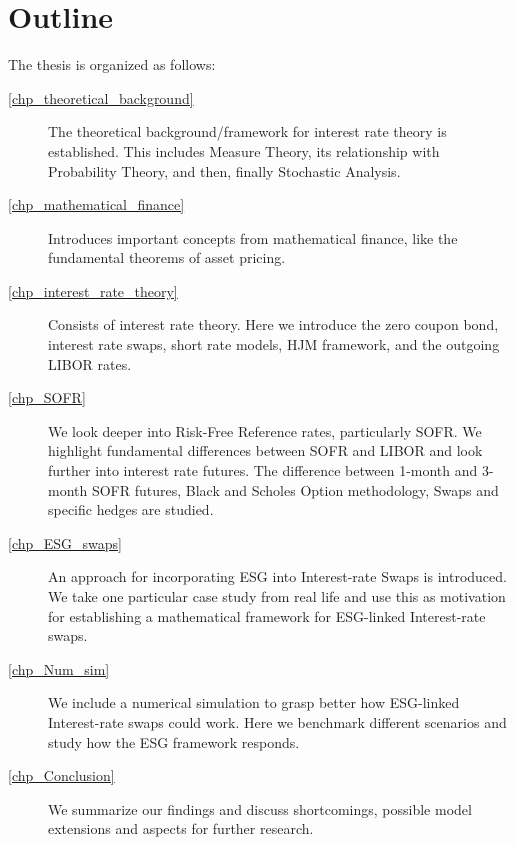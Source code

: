 \begin{comment}
 This thesis studies Risk-free reference rates (SOFR), the new key RFR in US dollars and ESG-linked interest rate swaps.   
\end{comment}

\newpage 

\section{Outline}

The thesis is organized as follows: 
\begin{description}
    \item[\cref{chp_theoretical_background}]
    The theoretical background/framework for interest rate theory is established. This includes Measure Theory, its relationship with Probability Theory, and then, finally Stochastic Analysis.  

    \item[\cref{chp_mathematical_finance}] Introduces important concepts from mathematical finance, like the fundamental theorems of asset pricing. 

    \item[\cref{chp_interest_rate_theory}] Consists of interest rate theory. Here we introduce the zero coupon bond, interest rate swaps, short rate models, HJM framework, and the outgoing LIBOR rates.

    \item[\cref{chp_SOFR}] We look deeper into Risk-Free Reference rates, particularly SOFR. We highlight fundamental differences between SOFR and LIBOR and look further into interest rate futures. The difference between 1-month and 3-month SOFR futures, Black and Scholes Option methodology, Swaps and specific hedges are studied. 
    

    \item[\cref{chp_ESG_swaps}] 
    An approach for incorporating ESG into Interest-rate Swaps is introduced. We take one particular case study from real life and use this as motivation for establishing a mathematical framework for ESG-linked Interest-rate swaps. 


    \item[\cref{chp_Num_sim}] 
    We include a numerical simulation to grasp better how ESG-linked Interest-rate swaps could work. 
    Here we benchmark different scenarios and study how the ESG framework responds.   

    \item[\cref{chp_Conclusion}]
    We summarize our findings and discuss shortcomings, possible model extensions and aspects for further research. 


\end{description}
